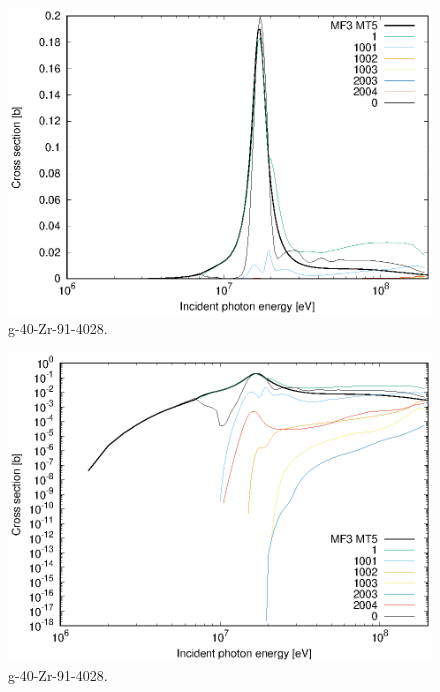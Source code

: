 \begin{figure}
 \includegraphics[width=\linewidth]{eps/g_40-Zr-91_4028.eps}
  \caption{g-40-Zr-91-4028.}
\end{figure}
\begin{figure}
 \includegraphics[width=\linewidth]{eps-log/g_40-Zr-91_4028.eps}
 \caption{g-40-Zr-91-4028.}
\end{figure}
\newpage \clearpage

